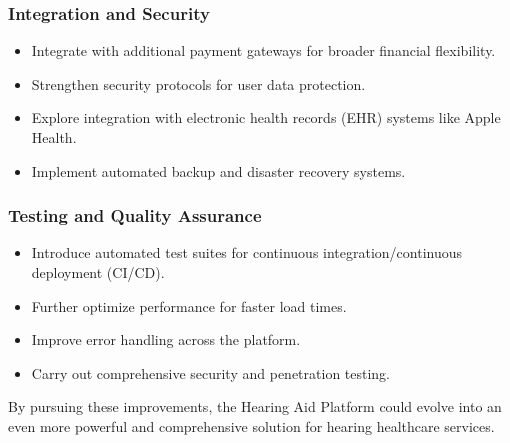 \documentclass{article}
\begin{document}
\subsubsection{Integration and Security}
\begin{itemize}
    \item Integrate with additional payment gateways for broader financial flexibility.
    \item Strengthen security protocols for user data protection.
    \item Explore integration with electronic health records (EHR) systems like Apple Health.    
    \item Implement automated backup and disaster recovery systems.
\end{itemize}

\subsubsection{Testing and Quality Assurance}
\begin{itemize}
    \item Introduce automated test suites for continuous integration/continuous deployment (CI/CD).
    \item Further optimize performance for faster load times.
    \item Improve error handling across the platform.
    \item Carry out comprehensive security and penetration testing.
\end{itemize}

By pursuing these improvements, the Hearing Aid Platform could evolve into an even more powerful and comprehensive solution for hearing healthcare services.

\newpage

\fancyhead[L]{} 
\end{document}
